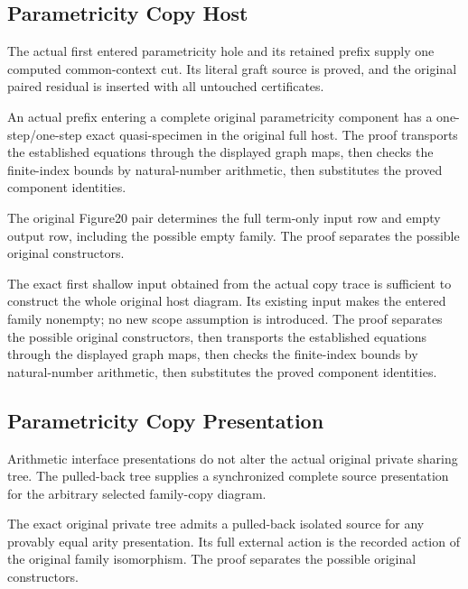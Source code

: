 \subsection{Parametricity Copy Host}
The actual first entered parametricity hole and its retained prefix
supply one computed common-context cut. Its literal graft source is proved,
and the original paired residual is inserted with all untouched certificates.

An actual prefix entering a complete original parametricity component
has a one-step/one-step exact quasi-specimen in the original full host.
The proof transports the established equations through the displayed graph maps, then checks the finite-index bounds by natural-number arithmetic, then substitutes the proved component identities.
\par{}

The original Figure20 pair determines the full term-only input row and
empty output row, including the possible empty family.
The proof separates the possible original constructors.
\par{}

The exact first shallow input obtained from the actual copy trace is
sufficient to construct the whole original host diagram. Its existing input
makes the entered family nonempty; no new scope assumption is introduced.
The proof separates the possible original constructors, then transports the established equations through the displayed graph maps, then checks the finite-index bounds by natural-number arithmetic, then substitutes the proved component identities.
\par{}

\subsection{Parametricity Copy Presentation}
Arithmetic interface presentations do not alter the actual original
private sharing tree. The pulled-back tree supplies a synchronized complete
source presentation for the arbitrary selected family-copy diagram.

The exact original private tree admits a pulled-back isolated source
for any provably equal arity presentation. Its full external action is the
recorded action of the original family isomorphism.
The proof separates the possible original constructors.
\par{}

